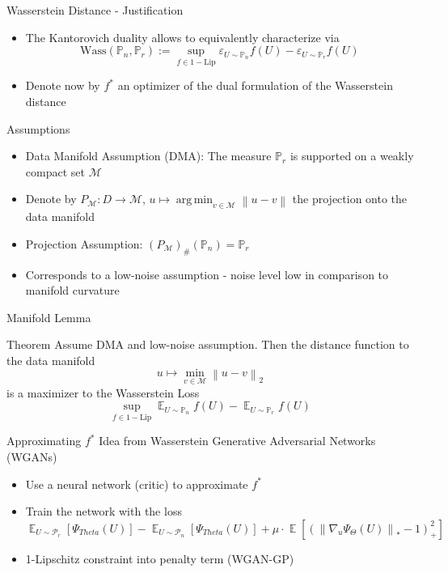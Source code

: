 \documentclass{beamer}
\newcommand{\norm}[1]{\left\lVert#1\right\rVert}
\DeclareMathOperator*{\argmin}{arg\,min}
\DeclareMathOperator{\EX}{\mathbb{E}}
\begin{document}
\begin{frame}{Wasserstein Distance - Justification}
\begin{itemize}
\item The Kantorovich duality allows to equivalently characterize via 
$$
\text{Wass}(\mathbb{P}_{n}, \mathbb{P}_{r}) := \sup_{f \in 1-\text{Lip}} \varepsilon_{U \sim \mathbb{P}_{n}} f(U) - \varepsilon_{U \sim \mathbb{P}_{r}} f(U)
$$
\item Denote now by $f^{*}$ an optimizer of the dual formulation of the Wasserstein distance
\end{itemize}
\end{frame}

\begin{frame}{Assumptions}
\begin{itemize}
\item Data Manifold Assumption (DMA): The measure $\mathbb{P}_{r}$ is supported on a weakly compact set $\mathcal{M}$
\item Denote by $P_{\mathcal{M}}: D \rightarrow \mathcal{M}$, $u \mapsto \argmin_{v \in \mathcal{M}} \norm{u - v}$ the projection onto the data manifold
\item Projection Assumption: $(P_{\mathcal{M}})_{\text{\#}}(\mathbb{P}_{n}) = \mathbb{P}_r$
\item Corresponds to a low-noise assumption - noise level low in comparison to manifold curvature
\end{itemize}
\end{frame}

\begin{frame}{Manifold Lemma}
\begin{block}{Theorem}
Assume DMA and low-noise assumption. Then the distance function to the data manifold
$$
u \mapsto \min\limits_{v \in \mathcal{M}} \norm{u - v}_{2}
$$
is a maximizer to the Wasserstein Loss
$$
\sup_{f \in 1-\text{Lip}} \EX_{U \sim \mathbb{P}_{n}} f(U) 
- \EX_{U \sim \mathbb{P}_{r}} f(U)
$$
\end{block}
\end{frame}

\begin{frame}{Approximating $f^{*}$}
Idea from Wasserstein Generative Adversarial Networks (WGANs)
\begin{itemize}
\item Use a neural network (critic) to approximate $f^{*}$
\item Train the network with the loss
$$
\EX_{U \sim \mathcal{P}_{r}}[\Psi_{Theta}(U)] - 
\EX_{U \sim \mathcal{P}_{n}}[\Psi_{Theta}(U)] +
\mu \cdot \EX\left[ \left( 
\norm{\nabla_{u} \Psi_{\Theta}(U)}_{*} - 1
\right)^{2}_{+}
\right]
$$
\item 1-Lipschitz constraint into penalty term (WGAN-GP)
\end{itemize}
\end{frame}
\end{document}
